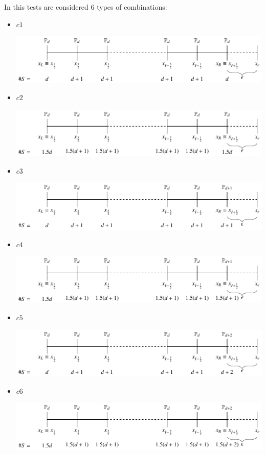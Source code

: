\documentclass[12pt,a4paper]{article}
\begin{document}
In this tests are considered 6 types of combinations:
\begin{itemize}
\item $c1$
\begin{center}
\includegraphics[width=.75\textwidth]{images/c1.pdf}
\end{center}
\item $c2$
\begin{center}
\includegraphics[width=.75\textwidth]{images/c2.pdf}
\end{center}
\item $c3$
\begin{center}
\includegraphics[width=.75\textwidth]{images/c3.pdf}
\end{center}
\item $c4$
\begin{center}
\includegraphics[width=.75\textwidth]{images/c4.pdf}
\end{center}
\item $c5$
\begin{center}
\includegraphics[width=.75\textwidth]{images/c5.pdf}
\end{center}
\item $c6$
\begin{center}
\includegraphics[width=.75\textwidth]{images/c6.pdf}
\end{center}
\end{itemize}
\pagebreak
\end{document}
